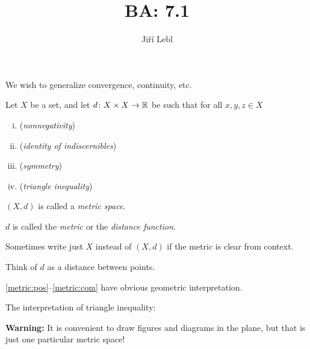 \documentclass[10pt,aspectratio=169]{beamer}
\author{Ji\v{r}\'i Lebl}
\institute[OSU]{%
Departemento pri Matematiko de Oklahoma {\^S}tata Universitato}
\title{BA: 7.1}
\date{}
\begin{document}
\begin{frame}
\titlepage
\end{frame}

\begin{frame}
We wish to generalize convergence, continuity, etc.

\pause

\begin{definition}
Let $X$ be a set, and let
$d \colon X \times X \to {\mathbb{R}}$
be such that for all $x,y,z \in X$
\begin{enumerate}[(i)]
%
\item \label{metric:pos}
\pause
{}
(\emph{nonnegativity})
%
\item \label{metric:zero}
\pause
{}
(\emph{identity of indiscernibles})
%
\item \label{metric:com}
\pause
{} 
(\emph{symmetry})
%
\item \label{metric:triang}
\pause
{}
(\emph{triangle inequality})
\end{enumerate}

\pause
\medskip

$(X,d)$ is called a \emph{metric space}.

\pause
\medskip
  
$d$ is called the \emph{metric} or the \emph{distance function}.

\pause
\medskip

Sometimes write just $X$ instead of $(X,d)$
if the metric is clear from context.
\end{definition}

\pause
Think of $d$ as a distance between points.

\pause
\medskip

\eqref{metric:pos}--\eqref{metric:com} have obvious geometric
interpretation.

\end{frame}

\begin{frame}

The interpretation of triangle inequality:

\medskip

\begin{center}
\end{center}

\pause
\medskip

\textbf{Warning:}
It is convenient to draw figures and diagrams in the plane,
but that is just one particular metric space!

\end{frame}
\end{document}
